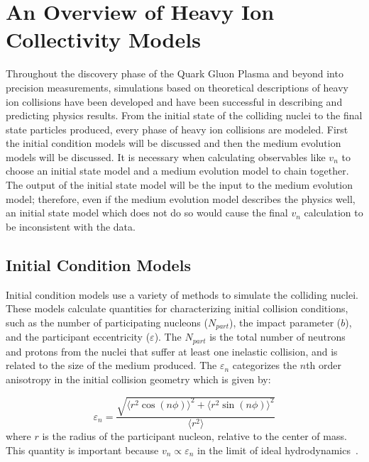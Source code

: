 \section{An Overview of Heavy Ion Collectivity Models}
Throughout the discovery phase of the Quark Gluon Plasma and beyond into precision measurements, simulations based on theoretical descriptions of heavy ion collisions have been developed and have been successful in describing and predicting physics results. From the initial state of the colliding nuclei to the final state particles produced, every phase of heavy ion collisions are modeled. First the initial condition models will be discussed and then the medium evolution models will be discussed. It is necessary when calculating observables like $v_n$ to choose an initial state model and a medium evolution model to chain together. The output of the initial state model will be the input to the medium evolution model; therefore, even if the medium evolution model describes the physics well, an initial state model which does not do so would cause the final $v_n$ calculation to be inconsistent with the data. 


\subsection{Initial Condition Models}
Initial condition models use a variety of methods to simulate the colliding nuclei. These models calculate quantities for characterizing initial collision conditions, such as the number of participating nucleons ($N_{part}$), the impact parameter ($b$), and the participant eccentricity ($\varepsilon$). The $N_{part}$ is the total number of neutrons and protons from the nuclei that suffer at least one inelastic collision, and is related to the size of the medium produced. The $\varepsilon_n$ categorizes the $n$th order anisotropy in the initial collision geometry which is given by:

\begin{equation}
\label{eqn:eccentricity_equation_ch2}
\varepsilon_n = \frac{\sqrt{\langle r^2 \cos(n\phi)\rangle^2+\langle r^2 \sin(n\phi)\rangle^2}}{\langle r^2\rangle}
\end{equation}
where $r$ is the radius of the participant nucleon, relative to the center of mass. This quantity is important because $v_n \propto \varepsilon_n$ in the limit of ideal hydrodynamics~\cite{PhysRevC.81.054905}.

